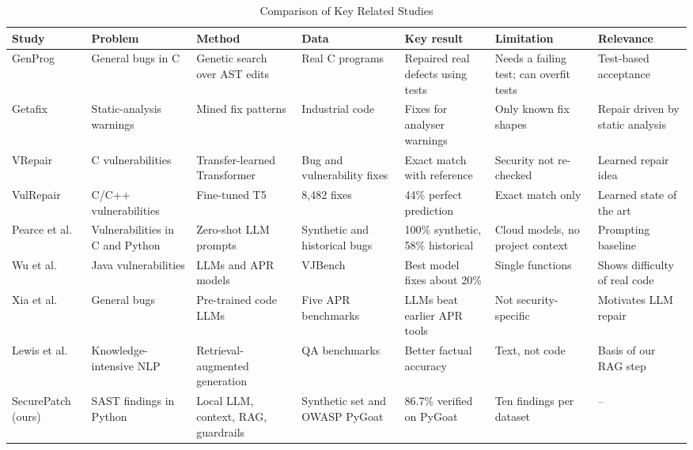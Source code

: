 \documentclass[12pt,onecolumn,draftclsnofoot]{IEEEtran}
\begin{document}
\begin{table}[!tb]
\centering
\caption{Comparison of Key Related Studies}
\label{tab:related}
\footnotesize
\renewcommand{\arraystretch}{1.25}
\setlength{\tabcolsep}{3pt}
\begin{tabular}{L{1.75cm} L{1.75cm} L{2.0cm} L{1.8cm} L{2.35cm} L{2.35cm} L{2.0cm}}
\toprule
\textbf{Study} & \textbf{Problem} & \textbf{Method} & \textbf{Data} & \textbf{Key result} & \textbf{Limitation} & \textbf{Relevance} \\
\midrule
GenProg \cite{legoues2012genprog} & General bugs in C & Genetic search over AST edits & Real C programs & Repaired real defects using tests & Needs a failing test; can overfit tests & Test-based acceptance \\
Getafix \cite{bader2019getafix} & Static-analysis warnings & Mined fix patterns & Industrial code & Fixes for analyser warnings & Only known fix shapes & Repair driven by static analysis \\
VRepair \cite{chen2023vrepair} & C vulnerabilities & Transfer-learned Transformer & Bug and vulnerability fixes & Exact match with reference & Security not re-checked & Learned repair idea \\
VulRepair \cite{fu2022vulrepair} & C/C++ vulnerabilities & Fine-tuned T5 & 8,482 fixes & 44\% perfect prediction & Exact match only & Learned state of the art \\
Pearce et al.\ \cite{pearce2023zeroshot} & Vulnerabilities in C and Python & Zero-shot LLM prompts & Synthetic and historical bugs & 100\% synthetic, 58\% historical & Cloud models, no project context & Prompting baseline \\
Wu et al.\ \cite{wu2023effective} & Java vulnerabilities & LLMs and APR models & VJBench & Best model fixes about 20\% & Single functions & Shows difficulty of real code \\
Xia et al.\ \cite{xia2023apr} & General bugs & Pre-trained code LLMs & Five APR benchmarks & LLMs beat earlier APR tools & Not security-specific & Motivates LLM repair \\
Lewis et al.\ \cite{lewis2020rag} & Knowledge-intensive NLP & Retrieval-augmented generation & QA benchmarks & Better factual accuracy & Text, not code & Basis of our RAG step \\
\midrule
SecurePatch (ours) & SAST findings in Python & Local LLM, context, RAG, guardrails & Synthetic set and OWASP PyGoat & 86.7\% verified on PyGoat & Ten findings per dataset & -- \\
\bottomrule
\end{tabular}
\end{table}
\end{document}
